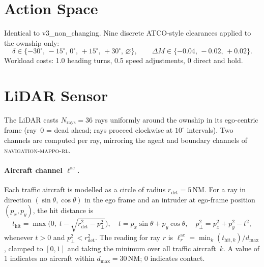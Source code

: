 \documentclass[11pt, a4paper]{article}
\begin{document}
\section{Action Space}

Identical to v3\_non\_changing.
Nine discrete ATCO-style clearances applied to the ownship only:
\begin{equation}
    \delta \in \{-30^\circ,\,-15^\circ,\,0^\circ,\,+15^\circ,\,+30^\circ,\,\varnothing\},
    \qquad
    \Delta M \in \{-0.04,\,-0.02,\,+0.02\}.
\end{equation}
Workload costs: 1.0 heading turns, 0.5 speed adjustments, 0 direct and hold.

\section{LiDAR Sensor}

The LiDAR casts $N_\text{rays} = 36$ rays uniformly around the ownship in its
ego-centric frame (ray~0 = dead ahead; rays proceed clockwise at $10^\circ$
intervals).
Two channels are computed per ray, mirroring the agent and boundary channels
of \textsc{navigation-mappo-rl}.

\paragraph{Aircraft channel $\boldsymbol{\ell}^\text{ac}$.}
Each traffic aircraft is modelled as a circle of radius $r_\text{det} = 5$\,NM.
For a ray in direction $(\sin\theta,\cos\theta)$ in the ego frame and an
intruder at ego-frame position $(p_x, p_y)$, the hit distance is
\begin{equation}
    t_\text{hit} = \max\!\bigl(0,\; t - \sqrt{r_\text{det}^2 - p_\perp^2}\bigr),
    \quad
    t = p_x\sin\theta + p_y\cos\theta,
    \quad
    p_\perp^2 = p_x^2 + p_y^2 - t^2,
\end{equation}
whenever $t > 0$ and $p_\perp^2 < r_\text{det}^2$.
The reading for ray $r$ is $\ell^\text{ac}_r = \min_k(t_{\text{hit},k})/d_\text{max}$,
clamped to $[0,1]$ and taking the minimum over all traffic aircraft~$k$.
A value of 1 indicates no aircraft within $d_\text{max} = 30$\,NM; 0 indicates
contact.
\end{document}
